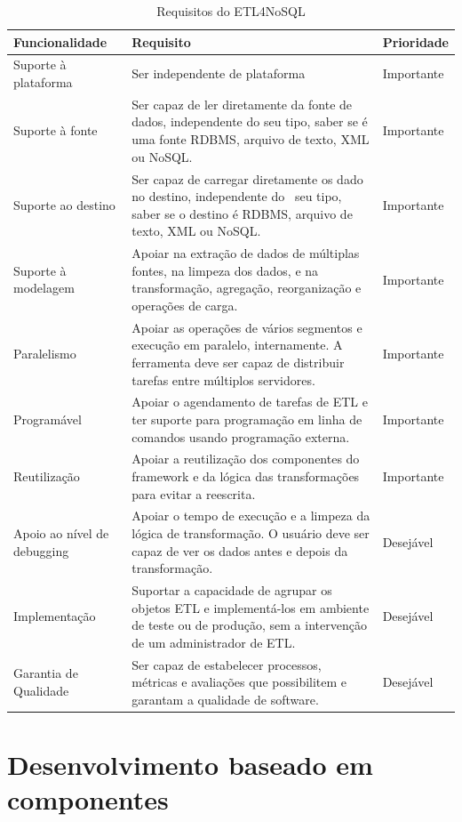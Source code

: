 \begin{table}[h]
	\centering
	\caption{Requisitos do ETL4NoSQL}
	\label{requisitos}
	\begin{tabular}{|p{3cm}| p{10cm}| p{2cm} |}
		\hline
		Funcionalidade & Requisito & Prioridade\\
		\hline
		Suporte à plataforma &  Ser independente de plataforma & Importante\\
		\hline
		Suporte à fonte &  Ser capaz de ler diretamente da fonte de dados, independente do seu tipo, saber se é uma fonte RDBMS, arquivo de texto, XML ou NoSQL. & Importante\\
		\hline
		Suporte ao destino & Ser capaz de carregar diretamente os dado no destino, independente do  seu tipo, saber se o destino é RDBMS, arquivo de texto, XML ou NoSQL. & Importante\\
		\hline
		Suporte à modelagem & Apoiar na extração de dados de múltiplas fontes, na limpeza dos dados, e na transformação, agregação, reorganização e operações de carga. & Importante\\
		\hline
		Paralelismo &Apoiar as operações de vários segmentos e execução em paralelo, internamente. A ferramenta deve ser capaz de distribuir tarefas entre múltiplos servidores. & Importante\\
		\hline
		Programável &Apoiar o agendamento de tarefas de ETL e ter suporte para programação em linha de comandos usando programação externa. & Importante\\
		\hline
		Reutilização & Apoiar a reutilização dos componentes do framework e da lógica das transformações para evitar a reescrita. & Importante\\
		\hline
		Apoio ao nível de debugging & Apoiar o tempo de execução e a limpeza da lógica de transformação. O usuário deve ser capaz de ver os dados antes e depois da transformação. & Desejável\\
		\hline
		Implementação & Suportar a capacidade de agrupar os objetos ETL e implementá-los em ambiente de teste ou de produção, sem a intervenção de um administrador de ETL. & Desejável\\
		\hline
		Garantia de Qualidade & Ser capaz de estabelecer processos, métricas e avaliações que possibilitem e garantam a qualidade de software. & Desejável\\
		\hline
		
		
	\end{tabular}
\end{table}

\section{Desenvolvimento baseado em componentes}


